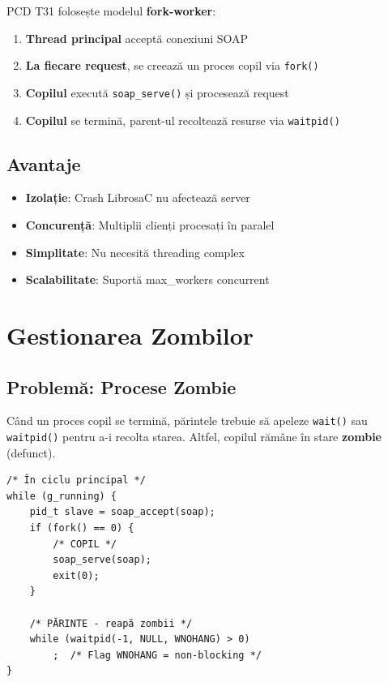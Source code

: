 \documentclass[12pt,a4paper,oneside]{book}
\begin{document}
PCD T31 folosește modelul \textbf{fork-worker}:

\begin{enumerate}
    \item \textbf{Thread principal} acceptă conexiuni SOAP
    \item \textbf{La fiecare request}, se creează un proces copil via \texttt{fork()}
    \item \textbf{Copilul} execută \texttt{soap\_serve()} și procesează request
    \item \textbf{Copilul} se termină, parent-ul recoltează resurse via \texttt{waitpid()}
\end{enumerate}

\subsection{Avantaje}

\begin{itemize}
    \item \textbf{Izolație}: Crash LibrosaC nu afectează server
    \item \textbf{Concurență}: Multiplii clienți procesați în paralel
    \item \textbf{Simplitate}: Nu necesită threading complex
    \item \textbf{Scalabilitate}: Suportă max\_workers concurrent
\end{itemize}

\section{Gestionarea Zombilor}

\subsection{Problemă: Procese Zombie}

Când un proces copil se termină, părintele trebuie să apeleze \texttt{wait()} sau \texttt{waitpid()} pentru a-i recolta starea. Altfel, copilul rămâne în stare \textbf{zombie} (defunct).

\begin{lstlisting}[caption=Recoltare non-blocking]
/* În ciclu principal */
while (g_running) {
    pid_t slave = soap_accept(soap);
    if (fork() == 0) {
        /* COPIL */
        soap_serve(soap);
        exit(0);
    }
    
    /* PĂRINTE - reapă zombii */
    while (waitpid(-1, NULL, WNOHANG) > 0)
        ;  /* Flag WNOHANG = non-blocking */
}
\end{lstlisting}
\end{document}
